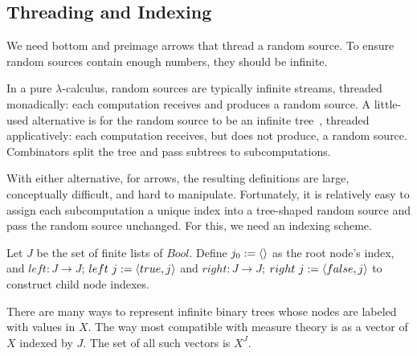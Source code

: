 \documentclass{llncs}
\begin{document}
\subsection{Threading and Indexing}
\label{sec:threading-and-indexing}

We need bottom and preimage arrows that thread a random source.
To ensure random sources contain enough numbers, they should be infinite.

In a pure $\lambda$-calculus, random sources are typically infinite streams, threaded monadically: each computation receives and produces a random source.
A little-used alternative is for the random source to be an infinite tree~\cite{cit:mcallester-2008tr-random-world}, threaded applicatively: each computation receives, but does not produce, a random source.
Combinators split the tree and pass subtrees to subcomputations.

With either alternative, for arrows, the resulting definitions are large, conceptually difficult, and hard to manipulate.
Fortunately, it is relatively easy to assign each subcomputation a unique index into a tree-shaped random source and pass the random source unchanged.
For this, we need an indexing scheme.

\begin{definition}
Let $J$ be the set of finite lists of $Bool$.
Define $j_0 := \langle{}\rangle$ as the root node's index, and $left : J \to J$; $left~j := \langle{true,j}\rangle$ and $right : J \to J$; $right~j := \langle{false,j}\rangle$ to construct child node indexes.
\end{definition}

There are many ways to represent infinite binary trees whose nodes are labeled with values in $X$.
The way most compatible with measure theory is as a vector of $X$ indexed by $J$.
The set of all such vectors is $X^J$.
\end{document}
